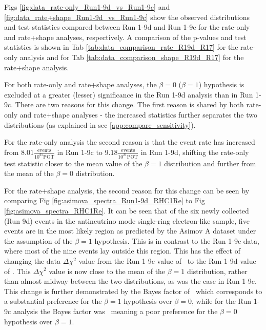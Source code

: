 {Figs \ref{fig:data_rate-only_Run1-9d_vs_Run1-9c} and \ref{fig:data_rate+shape_Run1-9d_vs_Run1-9c} show the observed distributions and test statistics compared between Run 1-9d and Run 1-9c for the rate-only and rate+shape analyses, respectively. A comparison of the p-values and test statistics is shown in Tab \ref{tab:data_comparison_rate_R19d_R17} for the rate-only analysis and for Tab \ref{tab:data_comparison_shape_R19d_R17} for the rate+shape analysis.

For both rate-only and rate+shape analyses, the $\beta=0$ ($\beta=1$) hypothesis is excluded at a greater (lesser) significance in the Run 1-9d analysis than in Run 1-9c. There are two reasons for this change. The first reason is shared by both rate-only and rate+shape analyses - the increased statistics further separates the two distributions (as explained in sec \ref{app:compare_sensitivity}). 

For the rate-only analysis the second reason is that the event rate has increased from $8.01 \frac{\text{events}}{10^{21} \text{POT}}$ in Run 1-9c to $9.18 \frac{\text{events}}{10^{21} \text{POT}}$ in Run 1-9d, shifting the rate-only test statistic closer to the mean value of the $\beta = 1$ distribution and further from the mean of the $\beta = 0$ distribution.

For the rate+shape analysis, the second reason for this change can be seen by comparing Fig \ref{fig:asimova_spectra_Run1-9d_RHC1Re} to Fig \ref{fig:asimova_spectra_RHC1Re}. It  can be seen that of the six newly collected (Run 9d) events in the antineutrino mode single-ring electron-like sample, five events are in the most likely region as predicted by the Asimov A dataset under the assumption of the $\beta = 1$ hypothesis. This is in contrast to the Run 1-9c data, where most of the nine events lay outside this region. This has the effect of changing the data $\Delta \chi^2$ value from the Run 1-9c value of \DeltachisqData\ to the Run 1-9d value of \DeltachisqDataRunOneNineD. This $\Delta \chi^2$ value is now close to the mean of the $\beta=1$ distribution, rather than almost midway between the two distributions, as was the case in Run 1-9c. This change is further demonstrated by the Bayes factor of \BayesFactorDataRunOneNineD\ which corresponds to a substantial preference for the $\beta = 1$ hypothesis over $\beta = 0$, while for the Run 1-9c analysis the Bayes factor was \BayesFactorData\, meaning a poor preference for the $\beta = 0$ hypothesis over $\beta = 1$.

\newpage


}
